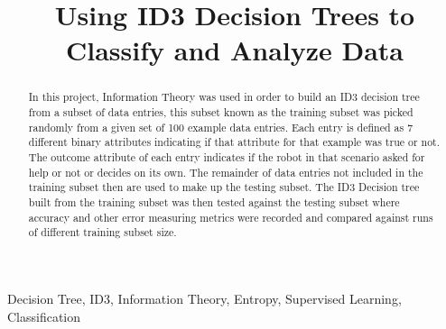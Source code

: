 \documentclass[conference]{IEEEtran}
\begin{document}
\title{Using ID3 Decision Trees to Classify and Analyze Data}

\author{
}

\maketitle

\begin{abstract}
   In this project, Information Theory was used in order to build an ID3 decision tree from a subset of data entries, this subset known as the training subset was picked randomly from a given set of 100 example data entries. Each entry is defined as 7 different binary attributes indicating if that attribute for that example was true or not. The outcome attribute of each entry indicates if the robot in that scenario asked for help or not or decides on its own. The remainder of data entries not included in the training subset then are used to make up the testing subset. The ID3 Decision tree built from the training subset was then tested against the testing subset where accuracy and other error measuring metrics were recorded and compared against runs of different training subset size.
\end{abstract}

\begin{IEEEkeywords}
    Decision Tree, ID3, Information Theory, Entropy, Supervised Learning, Classification
\end{IEEEkeywords}

\end{document}
